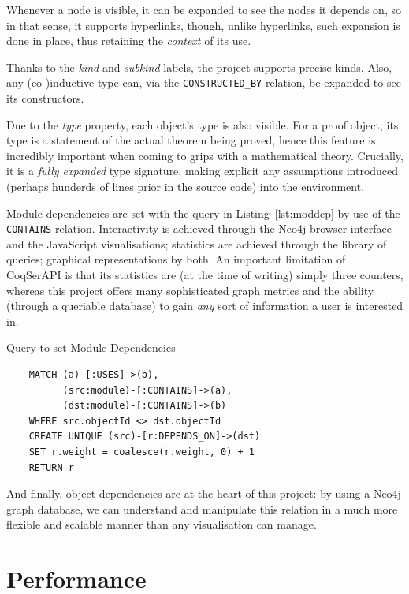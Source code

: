 Whenever a node is visible, it can be expanded to see the nodes it depends on,
so in that sense, it supports hyperlinks, though, unlike hyperlinks, such
expansion is done in place, thus retaining the \emph{context} of its use.

Thanks to the \emph{kind} and \emph{subkind} labels, the project supports
precise kinds.  Also, any (co-)inductive type can, via the
\texttt{CONSTRUCTED\_BY} relation, be expanded to see its constructors. 

Due to the \emph{type} property, each object's type is also visible. For a proof
object, its type is a statement of the actual theorem being proved, hence this
feature is incredibly important when coming to grips with a mathematical theory.
Crucially, it is a \emph{fully expanded} type signature, making explicit any
assumptions introduced (perhaps hunderds of lines prior in the source code) into
the environment.

Module dependencies are set with the query in Listing~\ref{lst:moddep} by use of
the \texttt{CONTAINS} relation.  Interactivity is achieved through the Neo4j
browser interface and the JavaScript visualisations; statistics are achieved
through the library of queries; graphical representations by both. An important
limitation of CoqSerAPI is that its statistics are (at the time of writing)
simply three counters, whereas this project offers many sophisticated graph
metrics and the ability (through a queriable database) to gain \emph{any} sort
of information a user is interested in.

\begin{listing}[p]%

\caption{Query to set Module Dependencies}\label{lst:moddep}

  \begin{verbatim}
    MATCH (a)-[:USES]->(b),
          (src:module)-[:CONTAINS]->(a),
          (dst:module)-[:CONTAINS]->(b)
    WHERE src.objectId <> dst.objectId
    CREATE UNIQUE (src)-[r:DEPENDS_ON]->(dst)
    SET r.weight = coalesce(r.weight, 0) + 1
    RETURN r
  \end{verbatim}

\end{listing}

And finally, object dependencies are at the heart of this project: by using a
Neo4j graph database, we can understand and manipulate this relation in a much
more flexible and scalable manner than any visualisation can manage.

\section{Performance}

